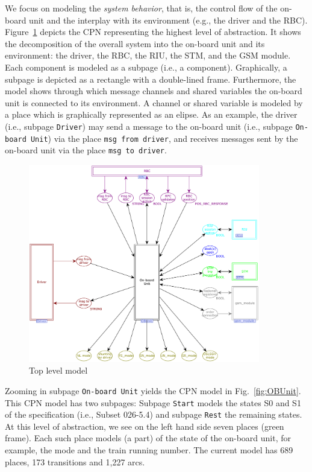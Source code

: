 We focus on modeling the \textit{system behavior}, that is, the control flow of the on-board unit and the interplay with its environment (e.g., the driver and the RBC). Figure~\ref{fig:Top} depicts the CPN representing the highest level of abstraction. It shows the decomposition of the overall system into the on-board unit and its environment: the driver, the RBC, the RIU, the STM, and the GSM module. Each component is modeled as a subpage (i.e., a component). Graphically, a subpage is depicted as a rectangle with a double-lined frame. Furthermore, the model shows through which message channels and shared variables the on-board unit is connected to its environment. A channel or shared variable is modeled by a place which is graphically represented as an elipse. As an example, the driver (i.e., subpage \texttt{Driver}) may send a message to the on-board unit (i.e., subpage \texttt{On-board Unit}) via the place \texttt{msg from driver}, and receives messages sent by the on-board unit via the place \texttt{msg to driver}.

\begin{figure}[tb]
	\centering
		\includegraphics[width=0.9\textwidth]{figures/Top.pdf}
	\caption{Top level model}
	\label{fig:Top}
\end{figure}

Zooming in subpage \texttt{On-board Unit} yields the CPN model in Fig.~\ref{fig:OBUnit}. This CPN model has two subpages: Subpage \texttt{Start} models the states S0 and S1 of the specification (i.e., Subset 026-5.4) and subpage \texttt{Rest} the remaining states. At this level of abstraction, we see on the left hand side seven places (green frame). Each such place models (a part) of the state of the on-board unit, for example, the mode and the train running number. The current model has 689 places, 173 transitions and 1,227 arcs.

